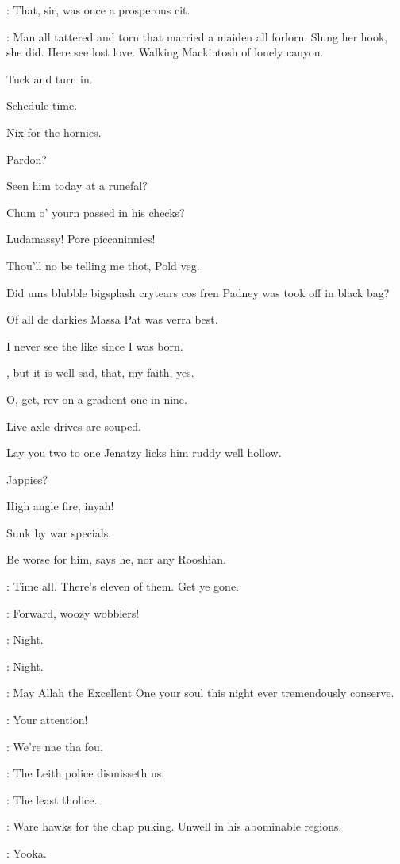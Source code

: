 \lynch:
That,
sir,
was once a prosperous cit.

\Bloom:
Man all tattered and torn that married a maiden all forlorn.
Slung her hook,
she did.
Here see lost love.
Walking Mackintosh of lonely canyon.

Tuck and turn in.

Schedule time.

Nix for the hornies.

Pardon?

Seen him today at a runefal?

Chum o' yourn passed in his checks?

Ludamassy!
Pore piccaninnies!

Thou'll no be telling me thot,
Pold veg.

Did ums blubble bigsplash crytears cos fren Padney
was took off in black bag?

Of all de darkies Massa Pat was verra best.

I never see the like since I was born.

,
but it is well sad,
that,
my faith,
yes.

O,
get,
rev on a gradient one in nine.

Live axle drives are souped.

Lay you two to one Jenatzy licks him ruddy well hollow.

Jappies?

High angle fire,
inyah!

Sunk by war specials.

Be worse for him,
says he,
nor any Rooshian.

\barman:
Time all.
There's eleven of them.
Get ye gone.

\lenehan:
Forward,
woozy wobblers!

\lynch:
Night.

\punch:
Night.

\dixon:
May Allah the Excellent One your soul this night ever
tremendously conserve.


\lenehan:
Your attention!

\crotthers:
We're nae tha fou.

\lynch:
The Leith police dismisseth us.

\lenehan:
The least tholice.

\punch:
Ware hawks for the chap puking.
Unwell in his abominable regions.

\stephen:
Yooka.

